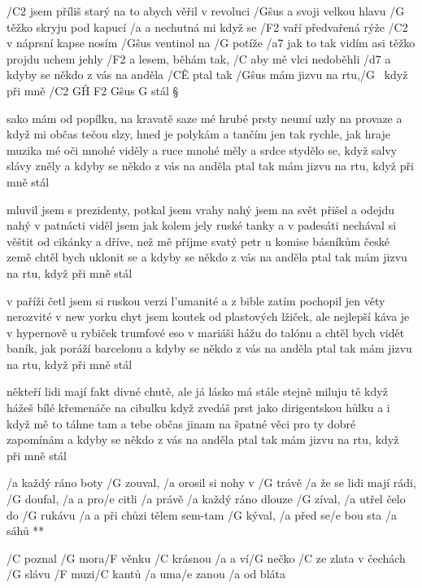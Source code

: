 
/C2 jsem příliš starý na to abych věřil v revoluci
/G\^{sus} a svoji velkou hlavu /G těžko skryju pod kapucí
/a a nechutná mi když se /F2 vaří předvařená rýže
/C2 v náprsní kapse nosím /G\^{sus} ventinol na /G potíže
/a7 jak to tak vidím asi těžko projdu uchem jehly
/F2 a lesem, běhám tak, /C aby mě vlci nedoběhli
/d7 a kdyby se někdo z vás na anděla /C\^E ptal
tak /G\^{sus} mám jizvu na rtu,/G ~když při mně /{C2 G\^H F2 G\^{sus} G} stál \S

sako mám od popílku, na kravatě saze
mé hrubé prsty neumí uzly na provaze
a když mi občas tečou slzy, hned je polykám
a tančím jen tak rychle, jak hraje muzika
mé oči mnohé viděly a ruce mnohé měly
a srdce stydělo se, když salvy slávy zněly
a kdyby se někdo z vás na anděla ptal
tak mám jizvu na rtu, když při mně stál \s

mluvil jsem s prezidenty, potkal jsem vrahy
nahý jsem na svět přišel a odejdu nahý
v patnácti viděl jsem jak kolem jely ruské tanky
a v padesáti nechával si věštit od cikánky
a dříve, než mě příjme svatý petr u komise
básníkům české země chtěl bych uklonit se
a kdyby se někdo z vás na anděla ptal
tak mám jizvu na rtu, když při mně stál \s

v paříži četl jsem si ruskou verzi l'umanité
a z bible zatím pochopil jen věty nerozvité
v new yorku chyt jsem koutek od plastových lžiček, ale
nejlepší káva je v hypernově u rybiček
trumfové eso v mariáši hážu do talónu
a chtěl bych vidět baník, jak poráží barcelonu
a kdyby se někdo z vás na anděla ptal
tak mám jizvu na rtu, když při mně stál \s

někteří lidi mají fakt divné chutě, ale
já lásko má stále stejně miluju tě
když hážeš bílé křemenáče na cibulku
když zvedáš prst jako dirigentskou hůlku
a i když mě to táhne tam a tebe občas jinam
na špatné věci pro ty dobré zapomínám
a kdyby se někdo z vás na anděla ptal
tak mám jizvu na rtu, když při mně stál





\R  /a každý ráno boty /G zouval,  /a orosil si nohy v /G trávě
    /a že se lidi mají rádi, /G doufal, /a a pro/e citli /a právě
    /a každý ráno dlouze /G zíval, /a utřel čelo do /G rukávu
    /a a při chůzi tělem sem-tam /G kýval, /a před se/e bou sta /a sáhů **

/C poznal /G mora/F věnku /C krásnou
/a a ví/G nečko /C ze zlata
v čechách /G slávu /F muzi/C kantů
/a uma/e zanou /a od bláta

